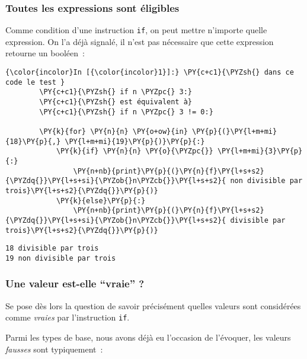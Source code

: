     \hypertarget{toutes-les-expressions-sont-uxe9ligibles}{%
\subsubsection{Toutes les expressions sont
éligibles}\label{toutes-les-expressions-sont-uxe9ligibles}}

    Comme condition d'une instruction \texttt{if}, on peut mettre n'importe
quelle expression. On l'a déjà signalé, il n'est pas nécessaire que
cette expression retourne un booléen~:

    \begin{Verbatim}[commandchars=\\\{\},frame=single,framerule=0.3mm,rulecolor=\color{cellframecolor}]
{\color{incolor}In [{\color{incolor}1}]:} \PY{c+c1}{\PYZsh{} dans ce code le test }
        \PY{c+c1}{\PYZsh{} if n \PYZpc{} 3:}
        \PY{c+c1}{\PYZsh{} est équivalent à}
        \PY{c+c1}{\PYZsh{} if n \PYZpc{} 3 != 0:}
        
        \PY{k}{for} \PY{n}{n} \PY{o+ow}{in} \PY{p}{(}\PY{l+m+mi}{18}\PY{p}{,} \PY{l+m+mi}{19}\PY{p}{)}\PY{p}{:}
            \PY{k}{if} \PY{n}{n} \PY{o}{\PYZpc{}} \PY{l+m+mi}{3}\PY{p}{:}
                \PY{n+nb}{print}\PY{p}{(}\PY{n}{f}\PY{l+s+s2}{\PYZdq{}}\PY{l+s+si}{\PYZob{}n\PYZcb{}}\PY{l+s+s2}{ non divisible par trois}\PY{l+s+s2}{\PYZdq{}}\PY{p}{)}
            \PY{k}{else}\PY{p}{:}
                \PY{n+nb}{print}\PY{p}{(}\PY{n}{f}\PY{l+s+s2}{\PYZdq{}}\PY{l+s+si}{\PYZob{}n\PYZcb{}}\PY{l+s+s2}{ divisible par trois}\PY{l+s+s2}{\PYZdq{}}\PY{p}{)}
\end{Verbatim}


    \begin{Verbatim}[commandchars=\\\{\},frame=single,framerule=0.3mm,rulecolor=\color{cellframecolor}]
18 divisible par trois
19 non divisible par trois
\end{Verbatim}

    \hypertarget{une-valeur-est-elle-vraie}{%
\subsubsection{Une valeur est-elle ``vraie''
?}\label{une-valeur-est-elle-vraie}}

    Se pose dès lors la question de savoir précisément quelles valeurs sont
considérées comme \emph{vraies} par l'instruction \texttt{if}.

Parmi les types de base, nous avons déjà eu l'occasion de l'évoquer, les
valeurs \emph{fausses} sont typiquement~:

